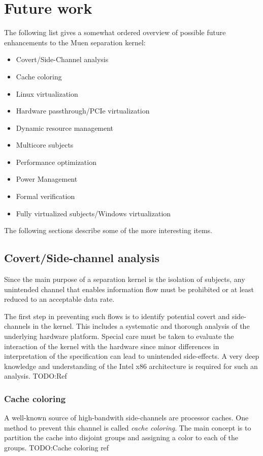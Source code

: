 \section{Future work}

The following list gives a somewhat ordered overview of possible future
enhancements to the Muen separation kernel:

\begin{itemize}
	\item Covert/Side-Channel analysis
	\item Cache coloring
	\item Linux virtualization
	\item Hardware passthrough/PCIe virtualization
	\item Dynamic resource management
	\item Multicore subjects
	\item Performance optimization
	\item Power Management
	\item Formal verification
	\item Fully virtualized subjects/Windows virtualization
\end{itemize}

The following sections describe some of the more interesting items.

\subsection{Covert/Side-channel analysis}
Since the main purpose of a separation kernel is the isolation of subjects, any
unintended channel that enables information flow must be prohibited or at least
reduced to an acceptable data rate.

The first step in preventing such flows is to identify potential covert and
side-channels in the kernel. This includes a systematic and thorough analysis of
the underlying hardware platform. Special care must be taken to evaluate the
interaction of the kernel with the hardware since minor differences in
interpretation of the specification can lead to unintended side-effects. A very
deep knowledge and understanding of the Intel x86 architecture is required for
such an analysis.
TODO:Ref

\subsubsection{Cache coloring}
A well-known source of high-bandwith side-channels are processor caches. One
method to prevent this channel is called \emph{cache coloring}. The main concept
is to partition the cache into disjoint groups and assigning a color to each of
the groups. TODO:Cache coloring ref

